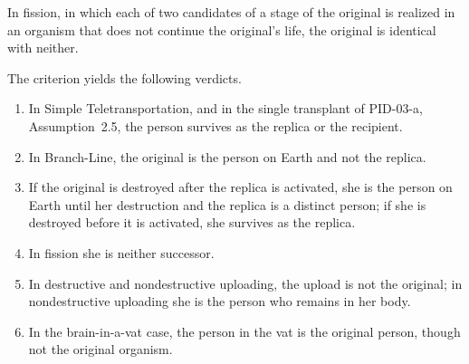 \documentclass{situationist-preprint}
\begin{document}
\begin{corollary}[Neither]\label{c:neither}
In fission, in which each of two candidates of a stage of the original is realized in an organism that does not continue the original's life, the original is identical with neither.
\end{corollary}

\begin{proposition}[Verdicts]\label{p:verdicts}
The criterion yields the following verdicts.
\begin{enumerate}[label=(\roman*)]
\item In Simple Teletransportation, and in the single transplant of PID-03-a, Assumption~2.5, the person survives as the replica or the recipient.
\item In Branch-Line, the original is the person on Earth and not the replica.
\item If the original is destroyed after the replica is activated, she is the person on Earth until her destruction and the replica is a distinct person; if she is destroyed before it is activated, she survives as the replica.
\item In fission she is neither successor.
\item In destructive and nondestructive uploading, the upload is not the original; in nondestructive uploading she is the person who remains in her body.
\item In the brain-in-a-vat case, the person in the vat is the original person, though not the original organism.
\end{enumerate}
\end{proposition}
\end{document}
